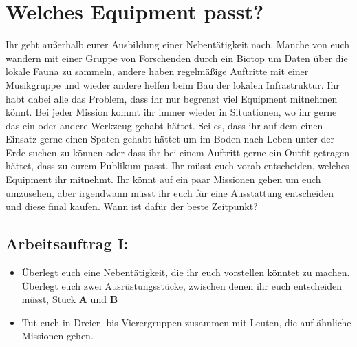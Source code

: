 \documentclass[]{article}
\begin{document}
\section*{Welches Equipment passt?}

Ihr geht außerhalb eurer Ausbildung einer Nebentätigkeit nach. Manche von euch wandern mit einer Gruppe von Forschenden durch ein Biotop um Daten über die lokale Fauna zu sammeln, andere haben regelmäßige Auftritte mit einer Musikgruppe und wieder andere helfen beim Bau der lokalen Infrastruktur. Ihr habt dabei alle das Problem, dass ihr nur begrenzt viel Equipment mitnehmen könnt. Bei jeder Mission kommt ihr immer wieder in Situationen, wo ihr gerne das ein oder andere Werkzeug gehabt hättet. Sei es, dass ihr auf dem einen Einsatz gerne einen Spaten gehabt hättet um im Boden nach Leben unter der Erde suchen zu können oder dass ihr bei einem Auftritt gerne ein Outfit getragen hättet, dass zu eurem Publikum passt. Ihr müsst euch vorab entscheiden, welches Equipment ihr mitnehmt. Ihr könnt auf ein paar Missionen gehen um euch umzusehen, aber irgendwann müsst ihr euch für eine Ausstattung entscheiden und diese final kaufen. Wann ist dafür der beste Zeitpunkt?\\

\subsection*{Arbeitsauftrag I:}
\begin{itemize}
	\item Überlegt euch eine Nebentätigkeit, die ihr euch vorstellen könntet zu machen. Überlegt euch zwei Ausrüstungsstücke, zwischen denen ihr euch entscheiden müsst, Stück \textbf{A} und \textbf{B}
	\item Tut euch in Dreier- bis Vierergruppen zusammen mit Leuten, die auf ähnliche Missionen gehen.
\end{itemize}
\end{document}
